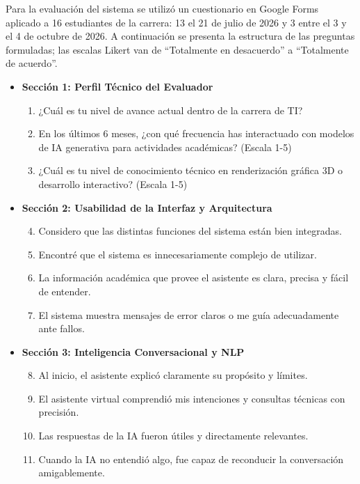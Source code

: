 
Para la evaluación del sistema se utilizó un cuestionario en Google Forms aplicado a 16 estudiantes de la carrera: 13 el 21 de julio de 2026 y 3 entre el 3 y el 4 de octubre de 2026. A continuación se presenta la estructura de las preguntas formuladas; las escalas Likert van de ``Totalmente en desacuerdo'' a ``Totalmente de acuerdo''.

\begin{itemize}
    \item \textbf{Sección 1: Perfil Técnico del Evaluador}
    \begin{enumerate}
        \item ¿Cuál es tu nivel de avance actual dentro de la carrera de TI?
        \item En los últimos 6 meses, ¿con qué frecuencia has interactuado con modelos de IA generativa para actividades académicas? (Escala 1-5)
        \item ¿Cuál es tu nivel de conocimiento técnico en renderización gráfica 3D o desarrollo interactivo? (Escala 1-5)
    \end{enumerate}
    \item \textbf{Sección 2: Usabilidad de la Interfaz y Arquitectura}
    \begin{enumerate}
        \setcounter{enumi}{3}
        \item Considero que las distintas funciones del sistema están bien integradas.
        \item Encontré que el sistema es innecesariamente complejo de utilizar.
        \item La información académica que provee el asistente es clara, precisa y fácil de entender.
        \item El sistema muestra mensajes de error claros o me guía adecuadamente ante fallos.
    \end{enumerate}
    \item \textbf{Sección 3: Inteligencia Conversacional y NLP}
    \begin{enumerate}
        \setcounter{enumi}{7}
        \item Al inicio, el asistente explicó claramente su propósito y límites.
        \item El asistente virtual comprendió mis intenciones y consultas técnicas con precisión.
        \item Las respuestas de la IA fueron útiles y directamente relevantes.
        \item Cuando la IA no entendió algo, fue capaz de reconducir la conversación amigablemente.

\end{enumerate}
\end{itemize}
